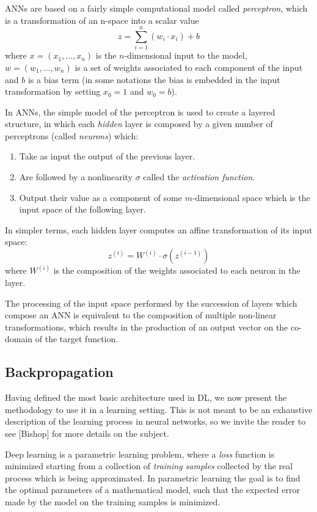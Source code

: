 ANNs are based on a fairly simple computational model called \textit{perceptron}, 
which is a transformation of an n-space into a scalar value 
\[
    z = \sum\limits_{i = 1}^{n} (w_i \cdot x_i) + b
\]
where $x = (x_1, ..., x_n)$ is the $n$-dimensional input to the model, 
$w  = (w_1, ..., w_n)$ is a set of weights associated to each component of the 
input and $b$ is a bias term (in some notations the bias is embedded in the 
input transformation by setting $x_0 = 1$ and $w_0 = b$).

In ANNs, the simple model of the perceptron is used to create a layered 
structure, in which each \textit{hidden} layer is composed by a given number 
of perceptrons (called \textit{neurons}) which:
%
\begin{enumerate}
    \item Take as input the output of the previous layer.
    \item Are followed by a nonlinearity $\sigma$ called the \textit{activation
    function}.
    \item Output their value as a component of some $m$-dimensional space 
    which is the input space of the following layer.
\end{enumerate}
%

In simpler terms, each hidden layer computes an affine transformation of its 
input space:
\[
    z^{(i)} = W^{(i)} \cdot \sigma(z^{(i-1)})
\]
where $W^{(i)}$ is the composition of the weights associated to each neuron in 
the layer. 

The processing of the input space performed by the succession of layers which 
compose an ANN is equivalent to the composition of multiple non-linear 
transformations, which results in the production of an output vector on the 
co-domain of the target function.

\subsection{Backpropagation}
Having defined the most basic architecture used in DL, we now present the 
methodology to use it in a learning setting. This is not meant to be an 
exhaustive description of the learning process in neural networks, so we
invite the reader to see [Bishop] for more details on the subject.

Deep learning is a parametric learning problem, where a \textit{loss} function 
is minimized starting from a collection of \textit{training samples} collected 
by the real process which is being approximated.
In parametric learning the goal is to find the optimal parameters of a 
mathematical model, such that the expected error made by the model
on the training samples is minimized.\\

